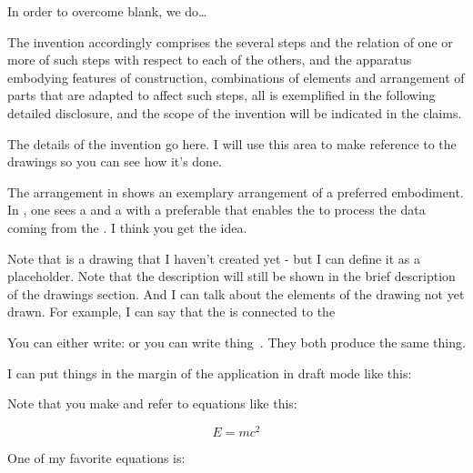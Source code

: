\documentclass[english]{uspatent}
\begin{document}
\patentParagraph In order to overcome blank, we do\ldots

\patentParagraph The invention accordingly comprises the several steps and the relation of one or more of such steps with respect to each of the others, and the apparatus embodying features of construction, combinations of elements and arrangement of parts that are adapted to affect such steps, all is exemplified in the following detailed disclosure, and the scope of the invention will be indicated in the claims.

\patentDrawingDescriptions{\noindent }


\patentParagraph The details of the invention go here. I will use this area to make reference to the drawings so you can see how it's done. 

\patentParagraph The arrangement in  shows an exemplary arrangement of a preferred embodiment. In , one sees a  and a  with a preferable  that enables the  to process the data coming from the . I think you get the idea.

\patentParagraph Note that  is a drawing that I haven't created yet - but I can define it as a placeholder. Note that the description will still be shown in the brief description of the drawings section. And I can talk about the elements of the drawing not yet drawn. For example, I can say that the  is connected to the 

\patentParagraph You can either write:  or you can write thing~. They both produce the same thing.

\patentParagraph I can put things in the margin of the application in draft mode like this: 

\patentParagraph Note that you make and refer to equations like this:

\begin{equation}
E=mc^{2}\label{eq:energy}
\end{equation}

\patentParagraph One of my favorite equations is:
\end{document}
